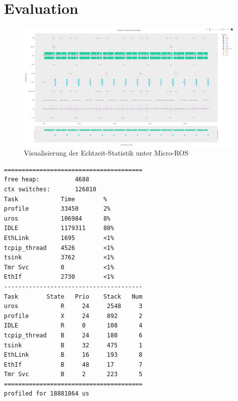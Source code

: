 \section{Evaluation}

\begin{figure}[h]
    \centering
    \includegraphics[width=1\textwidth]{assets/micro_ros_profiling}
    \caption{Visualisierung der Echtzeit-Statistik unter Micro-ROS}
    \label{fig:micro_ros_profiling}
\end{figure}

\begin{code}
\begin{verbatim}
=======================================
free heap:          4688
ctx switches:       126810
Task            Time        %
profile         33450       2%
uros            106984      8%
IDLE            1179311     88%
EthLink         1695        <1%
tcpip_thread    4526        <1%
tsink           3762        <1%
Tmr Svc         0           <1%
EthIf           2730        <1%
---------------------------------------
Task        State   Prio    Stack   Num
uros            R     24     2548     3
profile         X     24     892      2
IDLE            R     0      108      4
tcpip_thread    B     24     180      6
tsink           B     32     475      1
EthLink         B     16     193      8
EthIf           B     48     17       7
Tmr Svc         B     2      223      5
=======================================
profiled for 18881864 us
\end{verbatim}
    \label{code:freertos_summary_uros}
\end{code}

